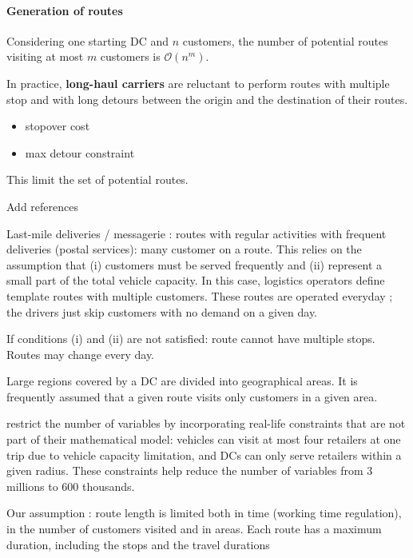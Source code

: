 \documentclass[a4paper,10pt]{article}
\begin{document}
\begin{linenumbers}
\paragraph{Generation of routes}


Considering one starting DC and $n$ customers, the number of potential routes visiting at most $m$ customers 
is $\mathcal{O}(n^m)$.

In practice, \textbf{long-haul carriers} are reluctant to perform routes with multiple stop and with long detours between the origin and the destination of their routes. 

\begin{itemize}
	\item stopover cost
	\item max detour constraint
\end{itemize}
This limit the set of potential routes. 

Add references 

Last-mile deliveries / messagerie : routes with regular activities with frequent deliveries (postal services): many customer on a route. This relies on the assumption that (i) customers must be served frequently and (ii) represent a small part of the total vehicle capacity. In this case, logistics operators define template routes with multiple customers. These routes are operated everyday ; the drivers just skip customers with no demand on a given day. 

If conditions (i) and (ii) are not satisfied: route cannot have multiple stops. Routes may change every day. 

Large regions covered by a DC are divided into geographical areas. It is frequently assumed that a given route visits only customers in a given area.


\cite{Zheng2019} restrict the number of variables by incorporating real-life constraints that are not part of their mathematical model: vehicles can visit at most four retailers at one trip due to vehicle capacity limitation, and DCs can only serve retailers within a given radius. These constraints help reduce the number of variables from 3 millions to 600 thousands.

Our assumption : route length is limited both in time (working time regulation), in the number of customers visited and in areas.   Each route has a maximum duration, including the stops and the travel durations




\end{linenumbers}
\end{document}
